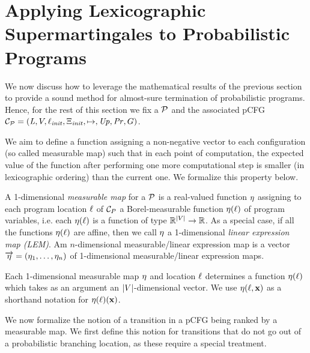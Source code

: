 \section{Applying Lexicographic Supermartingales to Probabilistic Programs}
\label{sec:lex-programs}

We now discuss how to leverage the mathematical results of the previous section 
to provide a sound method for almost-sure termination of probabilistic 
programs. Hence, for the rest of this section we fix a \PP{} $\mathcal{P}$ and the 
associated pCFG 
$\mathcal{C}_{\mathcal{P}}=(\mathit{L},V,\ell_{\mathit{init}},\Xi_{\mathit{init}},\mapsto,\mathit{Up},\mathit{Pr},G)$.

We aim to define a function assigning a non-negative vector to each 
configuration (so called measurable map) such that in each point of 
computation, the expected value of the function after performing one more 
computational step is smaller (in lexicographic ordering) than the current one. 
We formalize this property below.

\begin{definition}
A 1-dimensional \emph{measurable map} for a \PP{} $\mathcal{P}$ is a  
real-valued function $\eta$ 
assigning to each program location $\ell$ of $\mathcal{C}_P$ a Borel-measurable function $\eta(\ell)$  of program variables, i.e. each $\eta(\ell)$  is a function of type $\mathbb{R}^{|V|}\rightarrow \mathbb{R}$. As a special case, if all the functions $\eta(\ell)$ are affine, then we call $\eta$ a 1-dimensional \emph{linear expression map (LEM)}. 
Am $n$-dimensional measurable/linear expression map is a vector 
$\overrightarrow{\eta}=(\eta_1,\dots,\eta_n)$ of 1-dimensional 
measurable/linear expression maps. 
\end{definition}

Each 1-dimensional measurable map $\eta$ and location $\ell$ determines a function $\eta(\ell)$ 
which takes as an argument an $|V|$-dimensional vector. We use $\eta(\ell,\mathbf{x})$ as a shorthand 
notation for $\eta(\ell)(\mathbf{x})$.

We now formalize the notion of a transition in a pCFG being ranked by a 
measurable map. We first define this notion for transitions that do not go out 
of a probabilistic branching location, as these require a special treatment.


